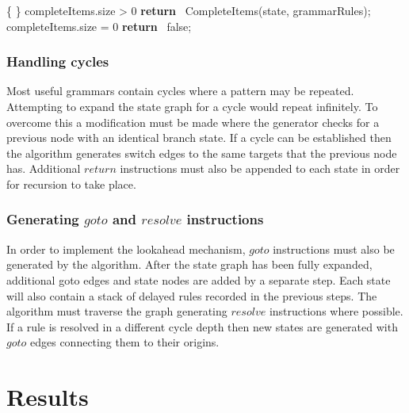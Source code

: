 \documentclass[envcountsame,runningheads]{llncs}
\begin{document}
\begin{center}
\begin{gcl}
  \{  \}
  \IF completeItems.size > 0 \rightarrow
    \textbf{return} \ CompleteItems(state, grammarRules);
  \BAR completeItems.size = 0 \rightarrow
    \textbf{return} \ false;
  \FI
\CORP

\end{gcl}
\end{center}

\subsubsection{Handling cycles}
Most useful grammars contain cycles where a pattern may be repeated. Attempting to expand the state graph for a cycle would repeat infinitely.
To overcome this a modification must be made where the generator checks for a previous node with an identical branch state. 
If a cycle can be established then the algorithm generates switch edges to the same targets that the previous node has. 
Additional $return$ instructions must also be appended to each state in order for recursion to take place.

\subsubsection{Generating $goto$ and $resolve$ instructions}
In order to implement the lookahead mechanism, $goto$ instructions must also be generated by the algorithm.
After the state graph has been fully expanded, additional goto edges and state nodes are added by a separate step.
Each state will also contain a stack of delayed rules recorded in the previous steps.
The algorithm must traverse the graph generating $resolve$ instructions where possible. 
If a rule is resolved in a different cycle depth then new states are generated with $goto$ edges connecting them to their origins.


\section{Results}
\end{document}
